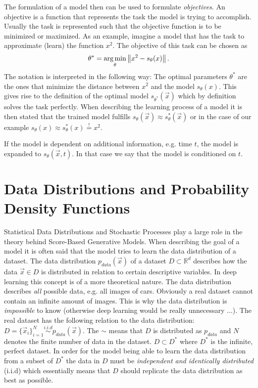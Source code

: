 The formulation of a model then can be used to formulate \textit{objectives}. An objective is a function that represents the task the model is trying to accomplish. Usually the task is represented such that the objective function is to be minimized or maximized. As an example, imagine a model that has the task to approximate (learn) the function $x^2$. The objective of this task can be chosen as
%
\begin{equation} 
    \theta^*=\underset{\theta}{\arg \min}\left\lVert x^2-s_\theta(x)\right\rVert.
\end{equation}
%
The notation is interpreted in the following way: The optimal parameters $\theta^*$ are the ones that minimize the distance between $x^2$ and the model $s_\theta(x)$. This gives rise to the definition of the optimal model $s_{\theta^*}(\vec{x})$ which by definition solves the task perfectly. When describing the learning process of a model it is then stated that the trained model fulfills $s_\theta(\vec{x})\approx s_{\theta}^*(\vec{x})$ or in the case of our example $s_\theta(x)\approx s_{\theta}^*(x)\overset{!}{=}x^2$.

If the model is dependent on additional information, e.g. time $t$, the model is expanded to $s_\theta(\vec{x}, t)$. In that case we say that the model is conditioned on $t$.
%
\section[Data Distributions and Probability Density Functions]{Data Distributions and Probability Density Functions%
    } \label{sec:3.3}
Statistical Data Distributions and Stochastic Processes play a large role in the theory behind Score-Based Generative Models. When describing the goal of a model it is often said that the model tries to learn the data distribution of a dataset. The data distribution $p_{data}(\vec{x})$ of a dataset $D\subset\mathbb{R}^d$  describes how the data $\vec{x}\in D$ is distributed in relation to certain descriptive variables. In deep learning this concept is of a more theoretical nature. The data distribution describes \textit{all} possible data, e.g. all images of cars. Obviously a real dataset cannot contain an infinite amount of images. This is why the data distribution is \textit{impossible} to know (otherwise deep learning would be really unnecessary $\dots$). The real dataset has the following relation to the data distribution: $D=\{\vec{x}_i\}_{i=1}^N\overset{i.i.d}{\sim}p_{data}(\vec{x})$. The $\sim$ means that $D$ is distributed as $p_{data}$ and $N$ denotes the finite number of data in the dataset. $D\subset D^*$ where $D^*$ is the infinite, perfect dataset. In order for the model being able to learn the data distribution from a subset of $D^*$ the data in $D$ must be \textit{independent and identically distributed} (i.i.d) which essentially means that $D$ should replicate the data distribution as best as possible.

